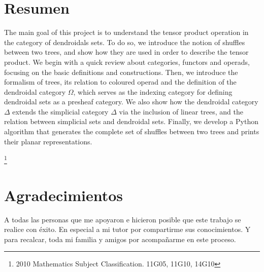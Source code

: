 \documentclass[11pt,a4paper,openright,oneside]{article}
\numberwithin{equation}{section}
\theoremstyle{definition}
\begin{document}


\section*{Resumen}
The main goal of this project is to understand the tensor product operation in the category of dendroidals sets.
To do so, we introduce the notion of shuffles between two trees, and show how they are used in order to describe the tensor product.
We begin with a quick review about categories, functors and operads, focusing on the basic definitions and constructions.
Then, we introduce the formalism of trees, its relation to coloured operad and the definition of the dendroidal category $\Omega$, which serves as the indexing category for defining dendroidal sets as a presheaf category.
We also show how the dendroidal category $\Delta$ extends the simplicial category $\Delta$ via the inclusion of linear trees, and the relation between simplicial sets and dendroidal sets.
Finally, we develop a Python algorithm that generates the complete set of shuffles between two trees and prints their planar representations.

 {\let\thefootnote\relax\footnote{2010 Mathematics Subject Classification. 11G05, 11G10, 14G10}}
\newpage


\section*{Agradecimientos}
A todas las personas que me apoyaron e hicieron posible que este trabajo se realice con \'exito.
En especial a mi tutor por compartirme sus conocimientos.
Y para recalcar, toda mi familia y amigos por acompa\~narme en este proceso.

\newpage


\tableofcontents
\newpage

\end{document}
